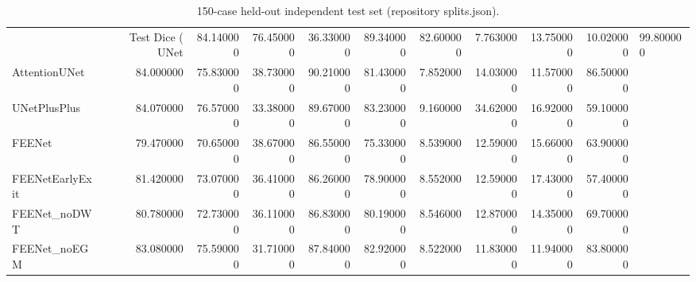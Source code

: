 \begin{table}
\caption{150-case held-out independent test set (repository splits.json).}
\label{tab:benchmark}
\begin{tabular}{lrrrrrrrrr}
\toprule
 & Test Dice (%
\midrule
UNet & 84.140000 & 76.450000 & 36.330000 & 89.340000 & 82.600000 & 7.763000 & 13.750000 & 10.020000 & 99.800000 \\
AttentionUNet & 84.000000 & 75.830000 & 38.730000 & 90.210000 & 81.430000 & 7.852000 & 14.030000 & 11.570000 & 86.500000 \\
UNetPlusPlus & 84.070000 & 76.570000 & 33.380000 & 89.670000 & 83.230000 & 9.160000 & 34.620000 & 16.920000 & 59.100000 \\
FEENet & 79.470000 & 70.650000 & 38.670000 & 86.550000 & 75.330000 & 8.539000 & 12.590000 & 15.660000 & 63.900000 \\
FEENetEarlyExit & 81.420000 & 73.070000 & 36.410000 & 86.260000 & 78.900000 & 8.552000 & 12.590000 & 17.430000 & 57.400000 \\
FEENet_noDWT & 80.780000 & 72.730000 & 36.110000 & 86.830000 & 80.190000 & 8.546000 & 12.870000 & 14.350000 & 69.700000 \\
FEENet_noEGM & 83.080000 & 75.590000 & 31.710000 & 87.840000 & 82.920000 & 8.522000 & 11.830000 & 11.940000 & 83.800000 \\
\bottomrule
\end{tabular}
\end{table}
